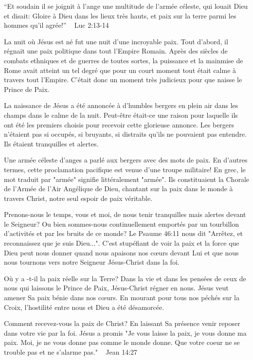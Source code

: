 

“Et soudain il se joignit à l’ange une multitude de l’armée céleste, qui louait Dieu et disait: Gloire à Dieu dans les lieux très hauts, et paix sur la terre parmi les hommes qu’il agrée!”                                                        ~ Luc 2:13-14

La nuit où Jésus est né fut une nuit d'une incroyable paix. Tout d'abord, il régnait une paix politique dans tout l'Empire Romain. Après des siècles de combats ethniques et de guerres de toutes sortes, la puissance et la mainmise de Rome avait atteint un tel degré que pour un court moment tout était calme à travers tout l'Empire. C'était donc un moment très judicieux pour que naisse le Prince de Paix.

La naissance de Jésus a été annoncée à d'humbles bergers en plein air dans les champs dans le calme de la nuit. Peut-être était-ce une raison pour laquelle ils ont été les premiers choisis pour recevoir cette glorieuse annonce. Les bergers n'étaient pas si occupés, si bruyants, si distraits qu'ils ne pouvaient pas entendre. Ils étaient tranquilles et alertes.

Une armée céleste d'anges a parlé aux bergers avec des mots de paix. En d'autres termes, cette proclamation pacifique est venue d'une troupe militaire! En grec, le mot traduit par "armée" signifie littéralement "armée". Ils constituaient la Chorale de l'Armée de l'Air Angélique de Dieu, chantant sur la paix dans le monde à travers Christ, notre seul espoir de paix véritable.

Prenons-nous le temps, vous et moi, de nous tenir tranquilles mais alertes devant le Seigneur? Ou bien sommes-nous continuellement emportés par un tourbillon d'activités et par les bruits de ce monde? Le Psaume 46:11 nous dit "Arrêtez, et reconnaissez que je suis Dieu...". C'est stupéfiant de voir la paix et la force que Dieu peut nous donner quand nous apaisons nos cœurs devant Lui et que nous nous tournons vers notre Seigneur Jésus-Christ dans la foi.

Où y a -t-il la paix réelle sur la Terre? Dans la vie et dans les pensées de ceux de nous qui laissons le Prince de Paix, Jésus-Christ régner en nous. Jésus veut amener Sa paix bénie dans nos cœurs. En mourant pour tous nos péchés sur la Croix, l'hostilité entre nous et Dieu a été désamorcée.

Comment recevez-vous la paix de Christ? En laissant Sa présence venir reposer dans votre vie par la foi. Jésus a promis "Je vous laisse la paix, je vous donne ma paix. Moi, je ne vous donne pas comme le monde donne. Que votre coeur ne se trouble pas et ne s'alarme pas." ~ Jean 14:27


